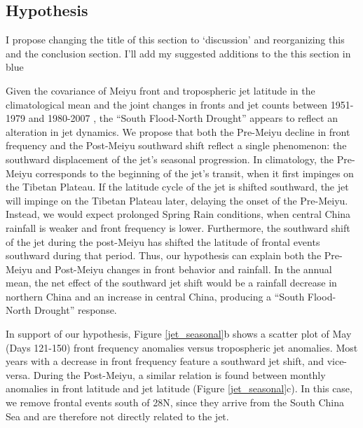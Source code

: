 \documentclass[draft,grl]{AGUTeX}
\begin{document}
\begin{article}
\section{Hypothesis}

{\color{red}  I propose changing the title of this section to `discussion' and reorganizing this and the conclusion section. I'll add my suggested additions to the this section in blue }  

	Given the covariance of Meiyu front and tropospheric jet latitude in the climatological mean and the joint changes in fronts and jet counts between 1951-1979 and 1980-2007 , the ``South Flood-North Drought'' appears to reflect an alteration in jet dynamics. We propose that both the Pre-Meiyu decline in front frequency and the Post-Meiyu southward shift reflect a single phenomenon: the southward displacement of the jet's seasonal progression. In climatology, the Pre-Meiyu corresponds to the beginning of the jet's transit, when it first impinges on the Tibetan Plateau. If the latitude cycle of the jet is shifted southward, the jet will impinge on the Tibetan Plateau later, delaying the onset of the Pre-Meiyu. Instead, we would expect prolonged Spring Rain conditions, when central China rainfall is weaker and front frequency is lower. Furthermore, the southward shift of the jet during the post-Meiyu has shifted the latitude of frontal events southward during that period. Thus, our hypothesis can explain both the Pre-Meiyu and Post-Meiyu changes in front behavior and rainfall. In the annual mean, the net effect of the southward jet shift would be a rainfall decrease in northern China and an increase in central China, producing a ``South Flood-North Drought'' response.
	
	In support of our hypothesis, Figure \ref{jet_seasonal}b shows a scatter plot of May (Days 121-150) front frequency anomalies versus tropospheric jet anomalies. Most years with a decrease in front frequency feature a southward jet shift, and vice-versa. During the Post-Meiyu, a similar relation is found between monthly anomalies in front latitude and jet latitude (Figure \ref{jet_seasonal}c). In this case, we remove frontal events south of 28\textdegree N, since they arrive from the South China Sea \citep{Day2015} and are therefore not directly related to the jet.


\end{article}
\end{document}
